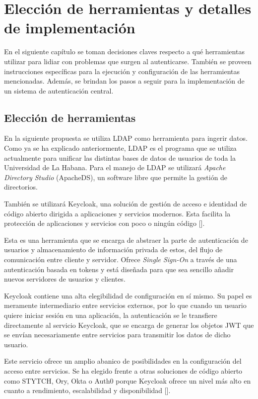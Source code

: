 \chapter{Elección de herramientas y detalles de implementación}\label{chapter:implementation}
En el siguiente capítulo se toman decisiones claves respecto a qué herramientas utilizar para lidiar con problemas que surgen al autenticarse. También se proveen instrucciones específicas para la ejecución y configuración de las herramientas mencionadas.  Además, se brindan los pasos a seguir para la implementación de un sistema de autenticación central. 

\section{Elección de herramientas} \label{tools-used}
En la siguiente propuesta se utiliza LDAP como herramienta para ingerir datos. Como ya se ha explicado anteriormente, LDAP es el programa que se utiliza actualmente para unificar las distintas bases de datos de usuarios de toda la Universidad de La Habana. Para el manejo de LDAP se utilizará \textit{Apache Directory Studio} (ApacheDS), un software libre que permite la gestión de directorios.

También se utilizará Keycloak, una solución de gestión de acceso e identidad de código abierto dirigida a aplicaciones y servicios modernos. Esta facilita la protección de aplicaciones y servicios con poco o ningún código [\cite{muyon2020metodos}]. 

Esta es una herramienta que se encarga de abstraer la parte de autenticación de usuarios y almacenamiento de información privada de estos, del flujo de comunicación entre cliente y servidor. Ofrece \textit{Single Sign-On} a través de una autenticación basada en tokens y está diseñada para que sea sencillo añadir nuevos servidores de usuarios y clientes.

Keycloak contiene una alta elegibilidad de configuración en sí mismo. Su papel es meramente intermediario entre servicios externos, por lo que cuando un usuario quiere iniciar sesión en una aplicación, la autenticación se le transfiere directamente al servicio Keycloak, que se encarga de generar los objetos JWT que se envían necesariamente entre servicios para transmitir los datos de dicho usuario.

Este servicio ofrece un amplio abanico de posibilidades en la configuración del acceso entre servicios. Se ha elegido frente a otras soluciones de código abierto como STYTCH, Ory, Okta o Auth0 porque Keycloak ofrece un nivel más alto en cuanto a rendimiento, escalabilidad y disponibilidad [\cite{lobato2022regulacion}]. 

